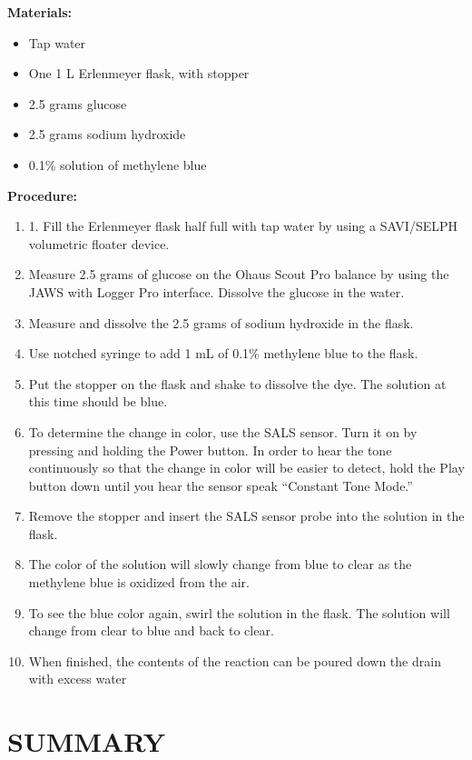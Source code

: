 \documentclass[11.5pt]{sig-alternate} %
\begin{document}
\begin{large}
\textbf{Materials:}

\begin{itemize}
    \item  Tap water
    \item  One 1 L Erlenmeyer flask, with stopper
    \item  2.5 grams glucose
    \item  2.5 grams sodium hydroxide
    \item  0.1\% solution of methylene blue
\end{itemize}

\textbf{Procedure:}
\begin{enumerate}
    \item 1. Fill the Erlenmeyer flask half full with tap water by using a SAVI/SELPH volumetric floater device.
    \item Measure 2.5 grams of glucose on the Ohaus Scout Pro balance by using the JAWS with Logger Pro interface. Dissolve the glucose in the water.
    \item Measure and dissolve the 2.5 grams of sodium hydroxide in the flask.
    \item Use notched syringe to add 1 mL of 0.1\% methylene blue to the flask.
    \item Put the stopper on the flask and shake to dissolve the dye. The solution at this time should be blue.
    \item To determine the change in color, use the SALS sensor. Turn it on by pressing and holding the Power button. In order to hear the tone continuously so that the change in color will be easier to detect, hold the Play button down until you hear the sensor speak “Constant Tone Mode.”
    \item Remove the stopper and insert the SALS sensor probe into the solution in the flask.
    \item The color of the solution will slowly change from blue to clear as the methylene blue is oxidized from the air.
    \item To see the blue color again, swirl the solution in the flask. The solution will change from clear to blue and back to clear.
    \item When finished, the contents of the reaction can be poured down the drain with excess water
\end{enumerate}

\section*{SUMMARY}


\end{large}
\end{document}
